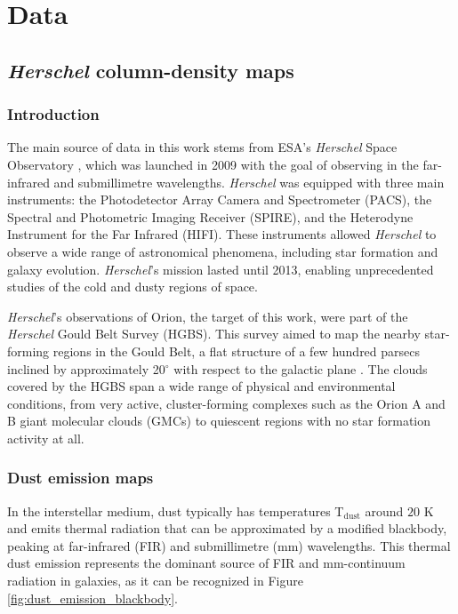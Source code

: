 \chapter{Data}
\label{chap:data}

\section{\textit{Herschel} column-density maps}
\subsection{Introduction}
The main source of data in this work stems from ESA's \textit{Herschel} Space Observatory \cite{pilbratt2010herschel}, which was launched in 2009 with the goal of observing in the far-infrared and submillimetre wavelengths. 
\textit{Herschel} was equipped with three main instruments: the Photodetector Array Camera and Spectrometer (PACS), the Spectral and Photometric Imaging Receiver (SPIRE), and the Heterodyne Instrument for the Far Infrared (HIFI). These instruments allowed \textit{Herschel} to observe a wide range of astronomical phenomena, including star formation and galaxy evolution.
\textit{Herschel}'s mission lasted until 2013, enabling unprecedented studies of the cold and dusty regions of space.

\textit{Herschel}'s observations of Orion, the target of this work, were part of the \textit{Herschel} Gould Belt Survey (HGBS). This survey aimed to map the nearby star-forming regions in the Gould Belt, a flat structure of a few hundred parsecs inclined by approximately 20$^{\circ}$ with respect to the galactic plane \cite{andre2010herschel}.
The clouds covered by the HGBS span a wide range of physical and environmental conditions, from very active, cluster-forming complexes such as the Orion A and B giant molecular clouds (GMCs) to quiescent regions with no star formation activity at all.

\subsection{Dust emission maps}
In the interstellar medium, dust typically has temperatures T$_{\mathrm{dust}}$ around $20$ K and emits thermal radiation that can be approximated by a modified blackbody, peaking at far-infrared (FIR) and submillimetre (mm) wavelengths. 
This thermal dust emission represents the dominant source of FIR and mm-continuum radiation in galaxies, as it can be recognized in Figure \ref{fig:dust_emission_blackbody}. 


